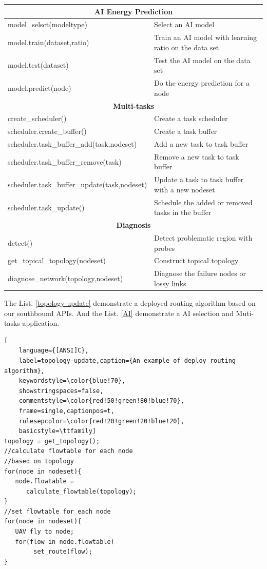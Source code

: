 \begin{table}[htbp]
{\begin{tabular}{|l|l|}
		\hline
		\multicolumn{2}{|c|}{\textbf{AI Energy Prediction}}\\
		\hline
		model\_selsct(modeltype) & Select an AI model\\
		\hline
		model.train(dataset,ratio) & Train an AI model with learning ratio on the data set\\
		\hline
		model.test(dataset) & Test the AI model on the data set\\
		\hline
		model.predict(node) & Do the energy prediction for a node \\
		\hline
		\multicolumn{2}{|c|}{\textbf{Multi-tasks}}\\
		\hline
		create\_scheduler() & Create a task scheduler \\
		\hline
		scheduler.create\_buffer() & Create a task buffer \\
		\hline
		scheduler.task\_buffer\_add(task,nodeset) & Add a new task to task buffer \\
		\hline
		scheduler.task\_buffer\_remove(task) & Remove a new task to task buffer \\
		\hline
		scheduler.task\_buffer\_update(task,nodeset) & Update a task to task buffer with a new nodeset \\
		\hline
		scheduler.task\_update() & Schedule the added or removed tasks in the buffer\\
		\hline
		\multicolumn{2}{|c|}{\textbf{Diagnosis}}\\
		\hline
		detect() & Detect problematic region with probes \\
		\hline
		get\_topical\_topology(nodeset) & Construct topical topology\\
		\hline
		diagnose\_network(topology,nodeset) & Diagnose the failure nodes or lossy links\\
		\hline
	\end{tabular}
	}
\end{table}

The List. \ref{topology-update} demonstrate a deployed routing algorithm based on our southbound APIs. 
And the List. \ref{AI} demonstrate a AI selection and Muti-tasks application.

\begin{lstlisting}[
	language={[ANSI]C},
	label=topology-update,caption={An example of deploy routing algorithm},
	keywordstyle=\color{blue!70},
	showstringspaces=false,
	commentstyle=\color{red!50!green!80!blue!70},
	frame=single,captionpos=t,
	rulesepcolor=\color{red!20!green!20!blue!20},
	basicstyle=\ttfamily]
topology = get_topology();
//calculate flowtable for each node
//based on topology
for(node in nodeset){
   node.flowtable =
      calculate_flowtable(topology);
}
//set flowtable for each node
for(node in nodeset){
   UAV fly to node;
   for(flow in node.flowtable)
        set_route(flow);
}

\end{lstlisting}


